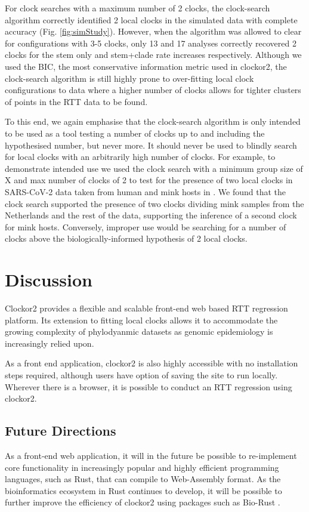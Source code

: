 \documentclass{article}
\begin{document}
For clock searches with a maximum number of 2 clocks, the clock-search algorithm correctly identified 2 local clocks in the simulated data with complete accuracy (Fig. \ref{fig:simStudy}). However, when the algorithm was allowed to clear for configurations with 3-5 clocks, only 13 and 17 analyses correctly recovered 2 clocks for the stem only and stem+clade rate increases respectively. Although we used the BIC, the most conservative information metric used in clockor2, the clock-search algorithm is still highly prone to over-fitting local clock configurations to data where a higher number of clocks allows for tighter clusters of points in the RTT data to be found.

To this end, we again emphasise that the clock-search algorithm is only intended to be used as a tool testing a number of clocks up to and including the hypothesised number, but never more. It should never be used to blindly search for local clocks with an arbitrarily high number of clocks. For example, to demonstrate intended use we used the clock search with a minimum group size of X and max number of clocks of 2 to test for the presence of two local clocks in SARS-CoV-2 data taken from human and mink hosts in \citet{porter2023evolutionary}. We found that the clock search supported the presence of two clocks dividing mink samples from the Netherlands and the rest of the data, supporting the inference of a second clock for mink hosts. Conversely, improper use would be searching for a number of clocks above the biologically-informed hypothesis of 2 local clocks.

\section*{Discussion}
Clockor2 provides a flexible and scalable front-end web based RTT regression platform. Its extension to fitting local clocks allows it to accommodate the growing complexity of phylodyanmic datasets as genomic epidemiology is increasingly relied upon. 

As a front end application, clockor2 is also highly accessible with no installation steps required, although users have option of saving the site to run locally. Wherever there is a browser, it is possible to conduct an RTT regression using clockor2. 

\subsection*{Future Directions}
As a front-end web application, it will in the future be possible to re-implement core functionality in increasingly popular and highly efficient programming languages, such as Rust, that can compile to Web-Assembly format. As the bioinformatics ecosystem in Rust continues to develop, it will be possible to further improve the efficiency of clockor2 using packages such as Bio-Rust \citep{koester_rust-bio-2015}.
\end{document}
